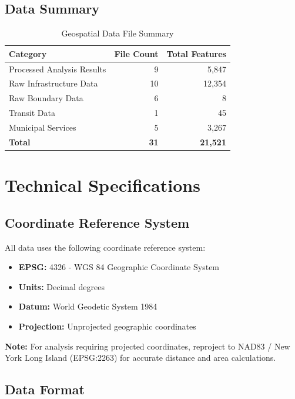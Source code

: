 \documentclass[11pt,letterpaper]{article}
\begin{document}
\subsection{Data Summary}

\begin{table}[h]
\centering
\caption{Geospatial Data File Summary}
\begin{tabular}{lrr}
\toprule
\textbf{Category} & \textbf{File Count} & \textbf{Total Features} \\
\midrule
Processed Analysis Results & 9 & 5,847 \\
Raw Infrastructure Data & 10 & 12,354 \\
Raw Boundary Data & 6 & 8 \\
Transit Data & 1 & 45 \\
Municipal Services & 5 & 3,267 \\
\textbf{Total} & \textbf{31} & \textbf{21,521} \\
\bottomrule
\end{tabular}
\end{table}

\section{Technical Specifications}

\subsection{Coordinate Reference System}

All data uses the following coordinate reference system:
\begin{itemize}
    \item \textbf{EPSG:} 4326 - WGS 84 Geographic Coordinate System
    \item \textbf{Units:} Decimal degrees
    \item \textbf{Datum:} World Geodetic System 1984
    \item \textbf{Projection:} Unprojected geographic coordinates
\end{itemize}

\textbf{Note:} For analysis requiring projected coordinates, reproject to NAD83 / New York Long Island (EPSG:2263) for accurate distance and area calculations.

\subsection{Data Format}
\end{document}
